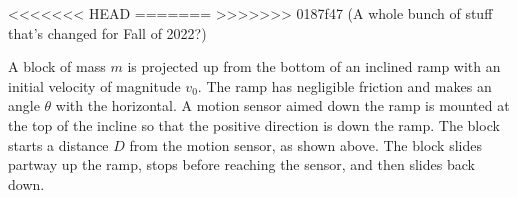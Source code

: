 \documentclass{../../oss-apphys-exam}
\begin{document}
\begin{questions}
\begin{questions}

<<<<<<< HEAD
=======
>>>>>>> 0187f47 (A whole bunch of stuff that's changed for Fall of 2022?)

  \question A block of mass $m$ is projected up from the bottom of an inclined
  ramp with an initial velocity of magnitude $v_0$. The ramp has negligible
  friction and makes an angle $\theta$ with the horizontal. A motion sensor
  aimed down the ramp is mounted at the top of the incline so that the positive
  direction is down the ramp. The block starts a distance $D$ from the motion
  sensor, as shown above. The block slides partway up the ramp, stops before
  reaching the sensor, and then slides back down.
\end{questions}
\end{questions}
\end{document}
